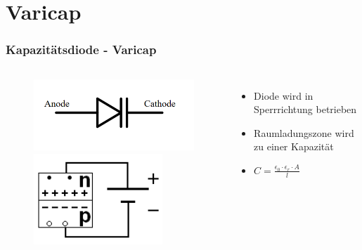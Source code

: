 \section*{Varicap}
\begin{frame}
\frametitle{Kapazitätsdiode - Varicap}
 \begin{columns}[c]
        \column[c]{5cm}
\begin{center}
\begin{figure}
            \includegraphics[width=.8\textwidth, height=.2\textheight, keepaspectratio]{e12/Varicap_Schaltzeichen.png}\\
            \includegraphics[width=0.8\textwidth,height=.4\textheight, keepaspectratio]{e12/Varicap_PN}
	\end{figure}
      \end{center}
        \column{5cm}
 \begin{itemize}
			\item Diode wird in Sperrrichtung betrieben
			\item Raumladungszone wird zu einer Kapazität
			\item $C=\frac{\epsilon_0\cdot\epsilon_r\cdot A}{l}$

    \end{itemize}
    \end{columns}
\end{frame}

